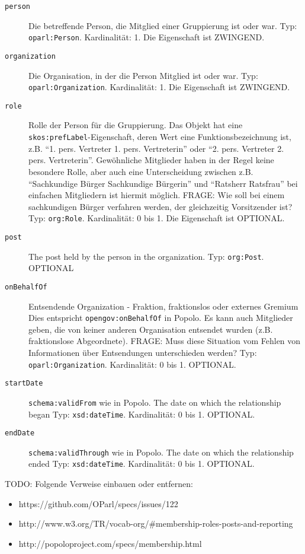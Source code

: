 \documentclass[,a4paper]{article}
\begin{document}
\begin{description}
\item[\texttt{person}]
Die betreffende Person, die Mitglied einer Gruppierung ist oder war.
Typ: \texttt{oparl:Person}. Kardinalität: 1. Die Eigenschaft ist
ZWINGEND.
\item[\texttt{organization}]
Die Organisation, in der die Person Mitglied ist oder war. Typ:
\texttt{oparl:Organization}. Kardinalität: 1. Die Eigenschaft ist
ZWINGEND.
\item[\texttt{role}]
Rolle der Person für die Gruppierung. Das Objekt hat eine
\texttt{skos:prefLabel}-Eigenschaft, deren Wert eine
Funktionsbezeichnung ist, z.B. ``1. pers. Vertreter \textbar{} 1. pers.
Vertreterin'' oder ``2. pers. Vertreter \textbar{} 2. pers.
Vertreterin''. Gewöhnliche Mitglieder haben in der Regel keine besondere
Rolle, aber auch eine Unterscheidung zwischen z.B. ``Sachkundige Bürger
\textbar{} Sachkundige Bürgerin'' und ``Ratsherr \textbar{} Ratsfrau''
bei einfachen Mitgliedern ist hiermit möglich. FRAGE: Wie soll bei einem
sachkundigen Bürger verfahren werden, der gleichzeitig Vorsitzender ist?
Typ: \texttt{org:Role}. Kardinalität: 0 bis 1. Die Eigenschaft ist
OPTIONAL.
\item[\texttt{post}]
The post held by the person in the organization. Typ: \texttt{org:Post}.
OPTIONAL
\item[\texttt{onBehalfOf}]
Entsendende Organization - Fraktion, fraktionslos oder externes Gremium
Dies entspricht \texttt{opengov:onBehalfOf} in Popolo. Es kann auch
Mitglieder geben, die von keiner anderen Organisation entsendet wurden
(z.B. fraktionslose Abgeordnete). FRAGE: Muss diese Situation vom Fehlen
von Informationen über Entsendungen unterschieden werden? Typ:
\texttt{oparl:Organization}. Kardinalität: 0 bis 1. OPTIONAL.
\item[\texttt{startDate}]
\texttt{schema:validFrom} wie in Popolo. The date on which the
relationship began Typ: \texttt{xsd:dateTime}. Kardinalität: 0 bis 1.
OPTIONAL.
\item[\texttt{endDate}]
\texttt{schema:validThrough} wie in Popolo. The date on which the
relationship ended Typ: \texttt{xsd:dateTime}. Kardinalität: 0 bis 1.
OPTIONAL.
\end{description}

TODO: Folgende Verweise einbauen oder entfernen:

\begin{itemize}
\itemsep1pt\parskip0pt
\item
  https://github.com/OParl/specs/issues/122
\item
  http://www.w3.org/TR/vocab-org/\#membership-roles-posts-and-reporting
\item
  http://popoloproject.com/specs/membership.html
\end{itemize}
\end{document}
